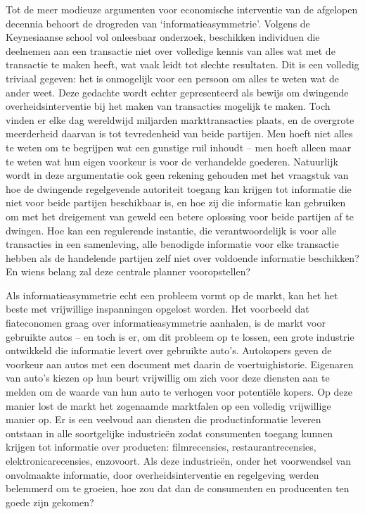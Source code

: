 Tot de meer modieuze argumenten voor economische interventie van de afgelopen decennia behoort de drogreden van `informatieasymmetrie'. Volgens de Keynesiaanse school vol onleesbaar onderzoek, beschikken individuen die deelnemen aan een transactie niet over volledige kennis van alles wat met de transactie te maken heeft, wat vaak leidt tot slechte resultaten. Dit is een volledig triviaal gegeven: het is onmogelijk voor een persoon om alles te weten wat de ander weet. Deze gedachte wordt echter gepresenteerd als bewijs om dwingende overheidsinterventie bij het maken van transacties mogelijk te maken. Toch vinden er elke dag wereldwijd miljarden markttransacties plaats, en de overgrote meerderheid daarvan is tot tevredenheid van beide partijen. Men hoeft niet alles te weten om te begrijpen wat een gunstige ruil inhoudt -- men hoeft alleen maar te weten wat hun eigen voorkeur is voor de verhandelde goederen. Natuurlijk wordt in deze argumentatie ook geen rekening gehouden met het vraagstuk van hoe de dwingende regelgevende autoriteit toegang kan krijgen tot informatie die niet voor beide partijen beschikbaar is, en hoe zij die informatie kan gebruiken om met het dreigement van geweld een betere oplossing voor beide partijen af te dwingen. Hoe kan een regulerende instantie, die verantwoordelijk is voor alle transacties in een samenleving, alle benodigde informatie voor elke transactie hebben als de handelende partijen zelf niet over voldoende informatie beschikken? En wiens belang zal deze centrale planner vooropstellen?

Als informatieasymmetrie echt een probleem vormt op de markt, kan het het beste met vrijwillige inspanningen opgelost worden. Het voorbeeld dat fiateconomen graag over informatieasymmetrie aanhalen, is de markt voor gebruikte auto\textquotesingle s -- en toch is er, om dit probleem op te lossen, een grote industrie ontwikkeld die informatie levert over gebruikte auto's. Autokopers geven de voorkeur aan auto\textquotesingle s met een document met daarin de voertuighistorie. Eigenaren van auto's kiezen op hun beurt vrijwillig om zich voor deze diensten aan te melden om de waarde van hun auto te verhogen voor potentiële kopers. Op deze manier lost de markt het zogenaamde marktfalen op een volledig vrijwillige manier op. Er is een veelvoud aan diensten die productinformatie leveren ontstaan in alle soortgelijke industrieën zodat consumenten toegang kunnen krijgen tot informatie over producten: filmrecensies, restaurantrecensies, elektronicarecensies, enzovoort. Als deze industrieën, onder het voorwendsel van onvolmaakte informatie, door overheidsinterventie en regelgeving werden belemmerd om te groeien, hoe zou dat dan de consumenten en producenten ten goede zijn gekomen?

